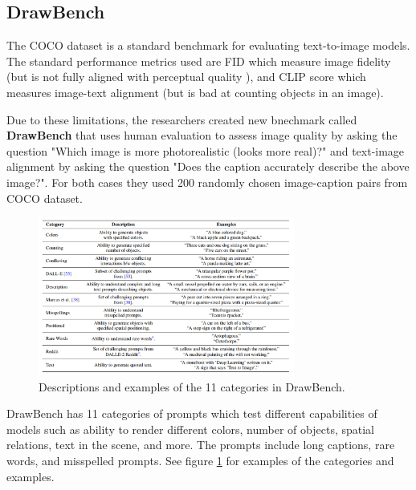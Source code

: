 \subsection{DrawBench}

The COCO dataset \cite{coco_dataset} is a standard benchmark for evaluating text-to-image models. The standard performance metrics used are FID \cite{fid_score} which measure image fidelity (but is not fully aligned with perceptual quality \cite{perceptual_quality}), and CLIP score \cite{openai_clip} which measures image-text alignment (but is bad at counting objects in an image).

Due to these limitations, the researchers created new bnechmark called \textbf{DrawBench} that uses human evaluation to assess image quality by asking the question "Which image is more photorealistic (looks more real)?" and text-image alignment by asking the question "Does the caption accurately describe the above image?". For both cases they used 200 randomly chosen image-caption pairs from COCO dataset.

\begin{figure}
    \centering
    \includegraphics[width=0.75\textwidth]{images/imagen/drawbench_categories.png}
    \caption{Descriptions and examples of the 11 categories in DrawBench.}
    \label{fig:imagen_drawbench_categories}
\end{figure}

DrawBench has 11 categories of prompts which test different capabilities of models such as ability to render different colors, number of objects, spatial relations, text in the scene, and more. The prompts include long captions, rare words, and misspelled prompts. See figure \ref{fig:imagen_drawbench_categories} for examples of the categories and examples.














